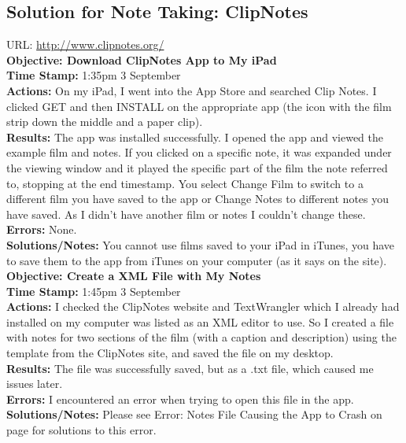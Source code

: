 \documentclass{article}
\begin{document}
\subsection{Solution for Note Taking: ClipNotes}
URL: \url{http://www.clipnotes.org/}\\

\textbf{Objective: Download ClipNotes App to My iPad}\\
\textbf{Time Stamp:} 1:35pm 3 September\\
\textbf{Actions:} On my iPad, I went into the App Store and searched Clip Notes. I clicked GET and then INSTALL on the appropriate app (the icon with the film strip down the middle and a paper clip).\\
\textbf{Results:} The app was installed successfully. I opened the app and viewed the example film and notes. If you clicked on a specific note, it was expanded under the viewing window and it played the specific part of the film the note referred to, stopping at the end timestamp. You select Change Film to switch to a different film you have saved to the app or Change Notes to different notes you have saved. As I didn't have another film or notes I couldn't change these.\\
\textbf{Errors:} None.\\
\textbf{Solutions/Notes:} You cannot use films saved to your iPad in iTunes, you have to save them to the app from iTunes on your computer (as it says on the site).\\

\textbf{Objective: Create a XML File with My Notes}\\
\textbf{Time Stamp:} 1:45pm 3 September\\
\textbf{Actions:} I checked the ClipNotes website and TextWrangler which I already had installed on my computer was listed as an XML editor to use. So I created a file with notes for two sections of the film (with a caption and description) using the template from the ClipNotes site, and saved the file on my desktop.\\
\textbf{Results:} The file was successfully saved, but as a .txt file, which caused me issues later. \\
\textbf{Errors:} I encountered an error when trying to open this file in the app. \\
\textbf{Solutions/Notes:} Please see Error: Notes File Causing the App to Crash on page \pageref{crash} for solutions to this error.\\
\end{document}
